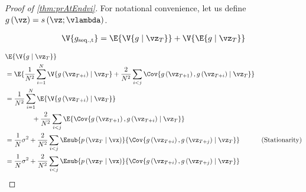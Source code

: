 \prAtEndRestatevi*
\label{proofsection:prAtEndvi}\begin{proof}[Proof of \autoref{thm:prAtEndvi}]\label{proof:prAtEndvi}For notational convenience, let us define \(g\left (\vz \right ) = s\left (\vz ; \vlambda \right )\). \par \begin {align} \V {g_{\mathrm {seq., t}}} = \E { \V {g \mid \vz _{T}} } + \V { \E {g \mid \vz _{T}} } \end {align} \par \begin {align} &\E { \V {g \mid \vz _{T}} } \\ &= \E { \frac {1}{N^2} \sum ^{N}_{i=1} \V { g\left (\vz _{T+i}\right ) \mid \vz _{T} } + \frac {2}{N^2} \sum _{i<j} \Cov {g\left (\vz _{T+1}\right ), g\left (\vz _{T+i}\right ) \mid \vz _{T} } } \\ &= \frac {1}{N^2} \sum ^{N}_{i=1} \E { \V { g\left (\vz _{T+i}\right ) \mid \vz _{T} } }\\ &\qquad \qquad + \frac {2}{N^2} \sum _{i<j} \E { \Cov {g\left (\vz _{T+1}\right ), g\left (\vz _{T+i}\right ) \mid \vz _{T} } } \\ &= \frac {1}{N} \sigma ^2 + \frac {2}{N^2} \sum _{i < j} \Esub {p\left (\vz _T\mid \vx \right )}{ \Cov { g\left (\vz _{T+i}\right ), g\left (\vz _{T+j}\right ) \mid \vz _T} } &\text {(Stationarity)} \\ &= \frac {1}{N} \sigma ^2 + \frac {2}{N^2} \sum _{i < j} \Esub {p\left (\vz _T\mid \vx \right )}{ \Cov { g\left (\vz _{T+i}\right ), g\left (\vz _{T+j}\right ) \mid \vz _T} } \end {align}\end{proof}
\prAtEndRestatevii*
